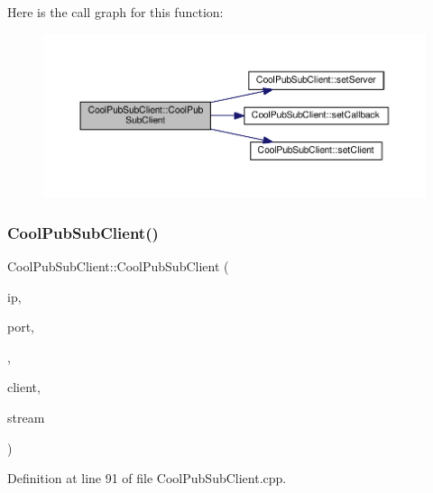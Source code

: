 Here is the call graph for this function\+:\nopagebreak
\begin{figure}[H]
\begin{center}
\leavevmode
\includegraphics[width=350pt]{class_cool_pub_sub_client_afc703702b40ba925377d0b9cd401319e_cgraph}
\end{center}
\end{figure}
\mbox{\label{class_cool_pub_sub_client_a08309a2cf058099fa5c96c198f777647}} 
\subsubsection{\texorpdfstring{Cool\+Pub\+Sub\+Client()}{CoolPubSubClient()}\hspace{0.1cm}{\footnotesize\ttfamily [10/14]}}
{\footnotesize\ttfamily Cool\+Pub\+Sub\+Client\+::\+Cool\+Pub\+Sub\+Client (\begin{DoxyParamCaption}\item[{uint8\+\_\+t $\ast$}]{ip,  }\item[{uint16\+\_\+t}]{port,  }\item[{\hyperlink{class_cool_pub_sub_client_a021ec75e9fbaf658370b8005ccfddc14}{M\+Q\+T\+T\+\_\+\+C\+A\+L\+L\+B\+A\+C\+K\+\_\+\+S\+I\+G\+N\+A\+T\+U\+RE}}]{,  }\item[{Client \&}]{client,  }\item[{Stream \&}]{stream }\end{DoxyParamCaption})}



Definition at line 91 of file Cool\+Pub\+Sub\+Client.\+cpp.

